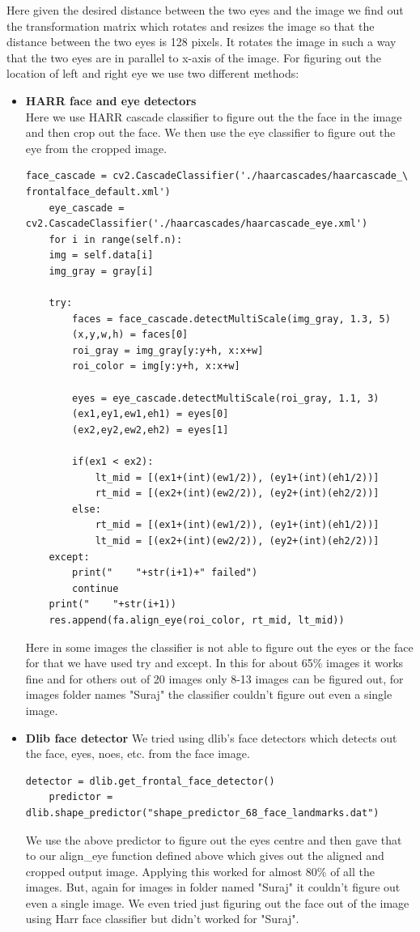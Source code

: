 Here given the desired distance between the two eyes and the image we find out the transformation matrix which rotates and resizes the image so that the distance between the two eyes is 128 pixels. It rotates the image in such a way that the two eyes are in parallel to x-axis of the image.
\newpage
For figuring out the location of left and right eye we use two different methods:
\begin{itemize}
    \item \textbf{HARR face and eye detectors}\\
    Here we use HARR cascade classifier to figure out the the face in the image and then crop out the face. We then use the eye classifier to figure out the eye from the cropped image.
    
    \begin{lstlisting}[style=Python]
    face_cascade = cv2.CascadeClassifier('./haarcascades/haarcascade_\
frontalface_default.xml')
    eye_cascade = cv2.CascadeClassifier('./haarcascades/haarcascade_eye.xml')
    for i in range(self.n):
	img = self.data[i]
	img_gray = gray[i]
			
	try:
	    faces = face_cascade.detectMultiScale(img_gray, 1.3, 5)
	    (x,y,w,h) = faces[0]
	    roi_gray = img_gray[y:y+h, x:x+w]
		roi_color = img[y:y+h, x:x+w]
				
		eyes = eye_cascade.detectMultiScale(roi_gray, 1.1, 3)
		(ex1,ey1,ew1,eh1) = eyes[0]
		(ex2,ey2,ew2,eh2) = eyes[1]
				
		if(ex1 < ex2):
		    lt_mid = [(ex1+(int)(ew1/2)), (ey1+(int)(eh1/2))]
		    rt_mid = [(ex2+(int)(ew2/2)), (ey2+(int)(eh2/2))]
		else:
		    rt_mid = [(ex1+(int)(ew1/2)), (ey1+(int)(eh1/2))]
		    lt_mid = [(ex2+(int)(ew2/2)), (ey2+(int)(eh2/2))]
	except:
		print("    "+str(i+1)+" failed")
		continue
	print("    "+str(i+1))
	res.append(fa.align_eye(roi_color, rt_mid, lt_mid))
    \end{lstlisting}
    Here in some images the classifier is not able to figure out the eyes or the face for that we have used try and except. In this for about 65\% images it works fine and for others out of 20 images only 8-13 images can be figured out, for images folder names "Suraj" the classifier couldn't figure out even a single image.
    
    \item \textbf{Dlib face detector}
    We tried using dlib's face detectors which detects out the face, eyes, noes, etc. from the face image.
    \begin{lstlisting}[style=Python]
    detector = dlib.get_frontal_face_detector()
    predictor = dlib.shape_predictor("shape_predictor_68_face_landmarks.dat")
    \end{lstlisting}
    We use the above predictor to figure out the eyes centre and then gave that to our align\_eye function defined above which gives out the aligned and cropped output image. Applying this worked for almost 80\% of all the images. But, again for images in folder named "Suraj" it couldn't figure out even a single image. We even tried just figuring out the face out of the image using Harr face classifier but didn't worked for "Suraj".
\end{itemize}
